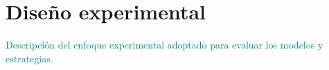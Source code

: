\section{Diseño experimental}
\textcolor{teal}{Descripción del enfoque experimental adoptado para evaluar los modelos y estrategias.}

